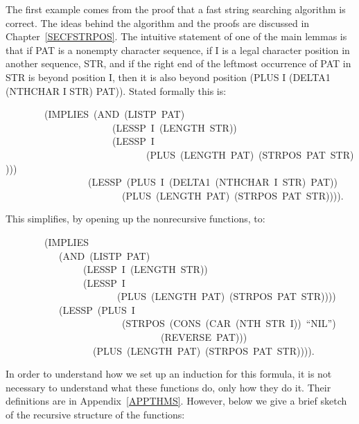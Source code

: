 \documentclass[11pt]{book}
\newenvironment{pubasis}{\begin{flushleft}\ttfamily\small}{\normalsize\rmfamily\end{flushleft}}
\begin{document}
The first example comes from the proof that a fast string searching
algorithm is correct.  The ideas behind the algorithm and the
proofs are discussed in Chapter~\ref{SECFSTRPOS}.  The intuitive
statement of one of the main lemmas is that if PAT is a nonempty
character sequence, if I is a legal character position in another sequence, STR,
and if the right end of the leftmost occurrence of PAT in STR
is beyond position I, then it is also beyond position (PLUS I (DELTA1 (NTHCHAR I STR) PAT)).
Stated formally this is:
\begin{pubasis}
~~~~~~~~(IMPLIES~(AND~(LISTP~PAT)\\
~~~~~~~~~~~~~~~~~~~~~~(LESSP~I~(LENGTH~STR))\\
~~~~~~~~~~~~~~~~~~~~~~(LESSP~I\\
~~~~~~~~~~~~~~~~~~~~~~~~~~~~~(PLUS~(LENGTH~PAT)~(STRPOS~PAT~STR))))\\
~~~~~~~~~~~~~~~~~(LESSP~(PLUS~I~(DELTA1~(NTHCHAR~I~STR)~PAT))\\
~~~~~~~~~~~~~~~~~~~~~~~~(PLUS~(LENGTH~PAT)~(STRPOS~PAT~STR)))).\\
\end{pubasis}
This simplifies, by opening up the nonrecursive functions, to:
\begin{pubasis}
~~~~~~~~(IMPLIES\\
~~~~~~~~~~~(AND~(LISTP~PAT)\\
~~~~~~~~~~~~~~~~(LESSP~I~(LENGTH~STR))\\
~~~~~~~~~~~~~~~~(LESSP~I\\
~~~~~~~~~~~~~~~~~~~~~~~(PLUS~(LENGTH~PAT)~(STRPOS~PAT~STR))))\\
~~~~~~~~~~~(LESSP~(PLUS~I\\
~~~~~~~~~~~~~~~~~~~~~~~~(STRPOS~(CONS~(CAR~(NTH~STR~I))~``NIL'')\\
~~~~~~~~~~~~~~~~~~~~~~~~~~~~~~~~(REVERSE~PAT)))\\
~~~~~~~~~~~~~~~~~~(PLUS~(LENGTH~PAT)~(STRPOS~PAT~STR)))).\\
\end{pubasis}
In order to understand how we set up an induction for this formula,
it is not necessary to understand what these functions
do, only how they do it.  Their definitions are in Appendix~\ref{APPTHMS}.  However,
below we  give a brief sketch of the recursive structure of the
functions:
\end{document}
